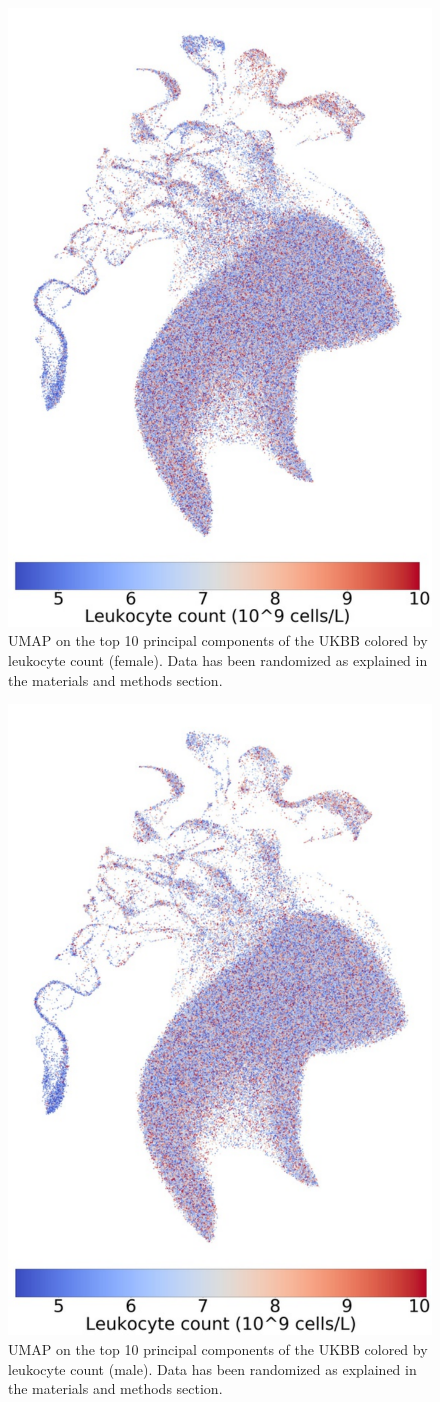 \documentclass[12pt]{pnas-new}
\begin{document}
\begin{figure}
    \centering
    \includegraphics[width=0.4\columnwidth]{images/UKBB_UMAP_PC10_NN15_MD05_2018328174511_201871416519_leukocyte_count_pct5_f.pdf}
    \caption{UMAP on the top 10 principal components of the UKBB colored by leukocyte count (female). Data has been randomized as explained in the materials and methods section.}
    \label{fig:supp_ukbb_leukocyte_f}
\end{figure}

\begin{figure}
    \centering
    \includegraphics[width=0.4\columnwidth]{images/UKBB_UMAP_PC10_NN15_MD05_2018328174511_201871416519_leukocyte_count_pct5_m.pdf}
    \caption{UMAP on the top 10 principal components of the UKBB colored by leukocyte count (male). Data has been randomized as explained in the materials and methods section.}
    \label{fig:supp_ukbb_leukocyte_m}
\end{figure}
\end{document}
